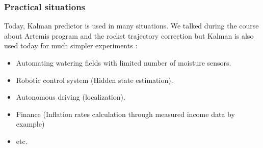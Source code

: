 \subsubsection{Practical situations}

Today, Kalman predictor is used in many situations.  We talked during the course about Artemis program and the rocket trajectory correction but Kalman is also used today for much simpler experiments :
\begin{itemize}
    \item Automating watering fields with limited number of moisture sensors.
    \item Robotic control system (Hidden state estimation).
    \item Autonomous driving (localization).
    \item Finance (Inflation rates calculation through measured income data by example)
    \item etc.
\end{itemize}


